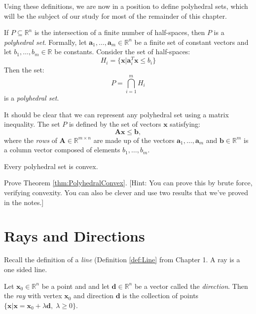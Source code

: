 Using these definitions, we are now in a position to define polyhedral sets, which will be the subject of our study for most of the remainder of this chapter. 

\begin{definition} If $P \subseteq \mathbb{R}^n$ is the intersection of a finite number of half-spaces, then $P$ is a \textit{polyhedral set}. Formally, let $\mathbf{a}_1,\dots,\mathbf{a}_m \in \mathbb{R}^n$ be a finite set of constant vectors and let $b_1,\dots,b_m \in \mathbb{R}$ be constants. Consider the set of half-spaces:
\begin{displaymath}
H_i = \{\mathbf{x} | \mathbf{a}_i^T\mathbf{x} \leq b_i\}
\end{displaymath}
Then the set:
\begin{equation}
P = \bigcap_{i=1}^m H_i
\end{equation}
is a \textit{polyhedral set}.
\label{defn:PolyhedralSet}
\end{definition}

It should be clear that we can represent any polyhedral set using a matrix inequality. The set $P$ is defined by the set of vectors $\mathbf{x}$ satisfying:
\begin{equation}
\mathbf{A}\mathbf{x} \leq \mathbf{b},
\end{equation}
where the \textit{rows} of $\mathbf{A} \in \mathbb{R}^{m \times n}$ are made up of the vectors $\mathbf{a}_1,\dots,\mathbf{a}_m$ and $\mathbf{b} \in \mathbb{R}^m$ is a column vector composed of elements $b_1,\dots,b_m$. 

\begin{theorem} Every polyhedral set is convex.
\label{thm:PolyhedralConvex}
\end{theorem}
\begin{exercise} Prove Theorem \ref{thm:PolyhedralConvex}. [Hint: You can prove this by brute force, verifying convexity. You can also be clever and use two results that we've proved in the notes.]
\end{exercise}

\section{Rays and Directions}
Recall the definition of a \textit{line} (Definition \ref{def:Line} from Chapter 1. A ray is a one sided line. 

\begin{definition}[Ray] Let $\mathbf{x}_0 \in \mathbb{R}^n$ be a point and and let $\mathbf{d} \in \mathbb{R}^n$ be a vector called the \textit{direction}. Then the \textit{ray} with vertex $\mathbf{x}_0$ and direction $\mathbf{d}$ is the collection of points $\{\mathbf{x} | \mathbf{x} = \mathbf{x}_0 + \lambda \mathbf{d},\;\lambda \geq 0\}$.
\end{definition}

